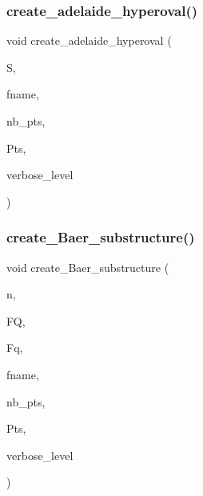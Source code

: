 \subsubsection{\texorpdfstring{create\+\_\+adelaide\+\_\+hyperoval()}{create\_adelaide\_hyperoval()}}
{\footnotesize\ttfamily void create\+\_\+adelaide\+\_\+hyperoval (\begin{DoxyParamCaption}\item[{\mbox{\hyperlink{classsubfield__structure}{subfield\+\_\+structure}} $\ast$}]{S,  }\item[{\mbox{\hyperlink{galois_8h_ab6cc7b4aeb6ea31aba2b3fbfc83ff5e6}{B\+Y\+TE}} $\ast$}]{fname,  }\item[{\mbox{\hyperlink{galois_8h_a09fddde158a3a20bd2dcadb609de11dc}{I\+NT}} \&}]{nb\+\_\+pts,  }\item[{\mbox{\hyperlink{galois_8h_a09fddde158a3a20bd2dcadb609de11dc}{I\+NT}} $\ast$\&}]{Pts,  }\item[{\mbox{\hyperlink{galois_8h_a09fddde158a3a20bd2dcadb609de11dc}{I\+NT}}}]{verbose\+\_\+level }\end{DoxyParamCaption})}

\mbox{\label{geometric__object_8_c_a64051ecfdc5a0fa3906833a68212ee25}} 
\subsubsection{\texorpdfstring{create\+\_\+\+Baer\+\_\+substructure()}{create\_Baer\_substructure()}}
{\footnotesize\ttfamily void create\+\_\+\+Baer\+\_\+substructure (\begin{DoxyParamCaption}\item[{\mbox{\hyperlink{galois_8h_a09fddde158a3a20bd2dcadb609de11dc}{I\+NT}}}]{n,  }\item[{\mbox{\hyperlink{classfinite__field}{finite\+\_\+field}} $\ast$}]{FQ,  }\item[{\mbox{\hyperlink{classfinite__field}{finite\+\_\+field}} $\ast$}]{Fq,  }\item[{\mbox{\hyperlink{galois_8h_ab6cc7b4aeb6ea31aba2b3fbfc83ff5e6}{B\+Y\+TE}} $\ast$}]{fname,  }\item[{\mbox{\hyperlink{galois_8h_a09fddde158a3a20bd2dcadb609de11dc}{I\+NT}} \&}]{nb\+\_\+pts,  }\item[{\mbox{\hyperlink{galois_8h_a09fddde158a3a20bd2dcadb609de11dc}{I\+NT}} $\ast$\&}]{Pts,  }\item[{\mbox{\hyperlink{galois_8h_a09fddde158a3a20bd2dcadb609de11dc}{I\+NT}}}]{verbose\+\_\+level }\end{DoxyParamCaption})}

